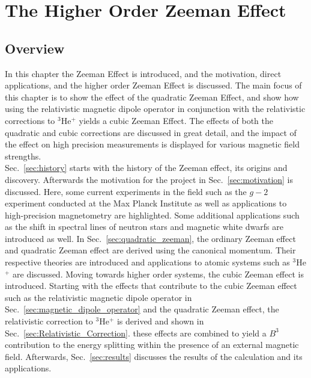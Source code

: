 \chapter{The Higher Order Zeeman Effect}\label{sec:Zeeman-Effect}
    \section{Overview}
        In this chapter the Zeeman Effect is introduced, and the motivation, direct applications, and the higher order Zeeman Effect is discussed. The main focus of this chapter is to show the effect of the quadratic Zeeman Effect, and show how using the relativistic magnetic dipole operator in conjunction with the relativistic corrections to $^3$He$^+$ yields a cubic Zeeman Effect. The effects of both the quadratic and cubic corrections are discussed in great detail, and the impact of the effect on high precision measurements is displayed for various magnetic field strengths.\\

       Sec.~\ref{sec:history} starts with the history of the Zeeman effect, its origins and discovery. Afterwards the motivation for the project in Sec.~\ref{sec:motivation} is discussed. Here, some current experiments in the field such as the $g-2$ experiment conducted at the Max Planck Institute as well as applications to high-precision magnetometry are highlighted. Some additional applications such as the shift in spectral lines of neutron stars and magnetic white dwarfs are introduced as well. In Sec.~\ref{sec:quadratic_zeeman}, the ordinary Zeeman effect and quadratic Zeeman effect are derived using the canonical momentum. Their respective theories are introduced and applications to atomic systems such as $^3$He$^+$ are discussed. Moving towards higher order systems, the cubic Zeeman effect is introduced. Starting with the effects that contribute to the cubic Zeeman effect such as the relativistic magnetic dipole operator in Sec.~\ref{sec:magnetic_dipole_operator} and the quadratic Zeeman effect, the relativistic correction to $^3$He$^+$ is derived and shown in Sec.~\ref{sec:Relativistic_Correction}. these effects are combined to yield a $B^3$ contribution to the energy splitting within the presence of an external magnetic field. Afterwards, Sec.~\ref{sec:results} discusses the results of the calculation and its applications.

